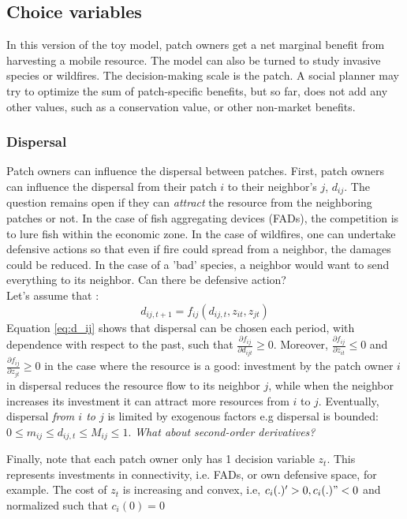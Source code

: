 \documentclass{article}
\begin{document}
\subsection{Choice variables}
In this version of the toy model, patch owners get a net marginal benefit from harvesting a mobile resource. The model can also be turned to study invasive species or wildfires. The decision-making scale is the patch. A social planner may try to optimize the sum of patch-specific benefits, but so far, does not add any other values, such as a conservation value, or other non-market benefits. 
\subsubsection{Dispersal}
Patch owners can influence the dispersal between patches. First, patch owners can influence the dispersal from their patch $i$ to their neighbor's $j$, $d_{ij}$. The question remains open if they can \textit{attract} the resource from the neighboring patches or not. In the case of fish aggregating devices (FADs), the competition is to lure fish within the economic zone. In the case of wildfires, one can undertake defensive actions so that even if fire could spread from a neighbor, the damages could be reduced. In the case of a 'bad' species, a neighbor would want to send everything to its neighbor. Can there be defensive action? 
\\
Let's assume that : 
\begin{equation}
    d_{ij,t+1} = f_{ij}(d_{ij,t}, z_{it}, z_{jt})
\label{eq:d_ij}
\end{equation}
Equation \ref{eq:d_ij} shows that dispersal can be chosen each period, with dependence with respect to the past, such that $\frac{\partial f_{ij}}{\partial d_{ijt}}\geq 0$. Moreover, $\frac{\partial f_{ij}}{\partial z_{it}}\leq 0$ and $\frac{\partial f_{ij}}{\partial z_{jt}}\geq 0$ in the case where the resource is a good: investment by the patch owner $i$ in dispersal reduces the resource flow to its neighbor $j$, while when the neighbor increases its investment it can attract more resources from $i$ to $j$. Eventually, dispersal \textit{from $i$ to $j$} is limited by exogenous factors e.g dispersal is bounded: $0\leq m_{ij} \leq d_{ij,t} \leq M_{ij} \leq 1$.
\textit{What about second-order derivatives?}

Finally, note that each patch owner only has 1 decision variable $z_t$. This represents investments in connectivity, i.e. FADs, or own defensive space, for example. The cost of $z_t$ is increasing and convex, i.e, $c_i(.)'>0, c_i(.)"<0$ and normalized such that $c_i(0)=0$
\end{document}
